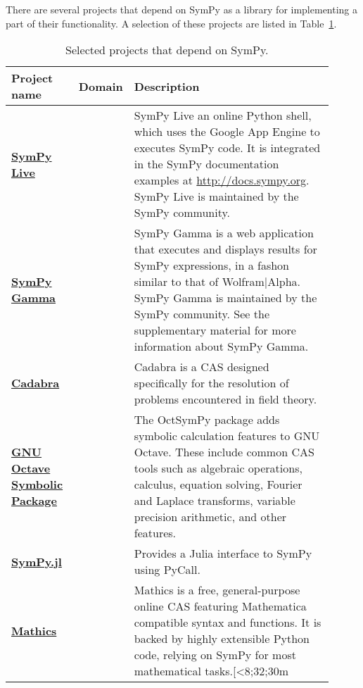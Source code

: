 There are several projects that depend on SymPy as a library for implementing
a part of their functionality. A selection of these projects are listed in
Table~\ref{projects-table}.

\begin{longtable}[htbc]{>{\raggedright}p{0.14\linewidth}p{0.14\linewidth}p{0.63\linewidth}}
\caption{Selected projects that depend on SymPy.\label{projects-table}}\\
\toprule
\textbf{Project name} & \textbf{Domain} & \textbf{Description} \\
\midrule
\href{http://live.sympy.org/}{\textbf{SymPy Live}} &  & SymPy Live an online
  Python shell, which uses the Google App Engine to executes SymPy code. It is
  integrated in the SymPy documentation examples at
  \href{http://docs.sympy.org}{http://docs.sympy.org}. SymPy Live is
  maintained by the SymPy community. \\

\href{http://sympygamma.com/}{\textbf{SymPy Gamma}} &  & SymPy Gamma is a
  web application that executes and displays results for SymPy expressions, in
  a fashon similar to that of Wolfram|Alpha. SymPy Gamma is maintained by the
  SymPy community. See the supplementary material for more information about
  SymPy Gamma. \\

\href{http://cadabra.science/index.html}{\textbf{Cadabra}}~\cite{Peeters2007cadabra} &  &
  Cadabra is a CAS designed specifically for the resolution of problems
  encountered in field theory. \\

\href{https://github.com/cbm755/octsympy}{\textbf{GNU Octave Symbolic Package}}~\cite{OctSymPy} &  &
  The OctSymPy package adds symbolic calculation features
  to GNU Octave. These include common CAS tools such
  as algebraic operations, calculus, equation solving, Fourier and
  Laplace transforms, variable precision arithmetic, and other features. \\

\href{https://github.com/jverzani/SymPy.jl}{\textbf{SymPy.jl}}~\cite{SymPy.jl} &  &
  Provides a Julia interface to SymPy using PyCall. \\

\href{https://mathics.github.io/}{\textbf{Mathics}}~\cite{Mathics} &  & Mathics is a
  free, general-purpose online CAS featuring Mathematica compatible
  syntax and functions. It is backed by highly extensible Python code,
  relying on SymPy for most mathematical tasks.[<8;32;30m \\


\end{longtable}

